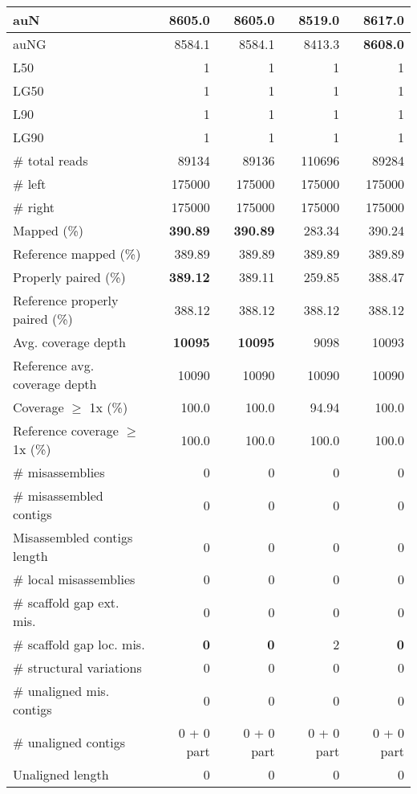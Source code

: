 \documentclass[12pt,a4paper]{article}
\begin{document}
\begin{table}[ht]
\begin{center}
\begin{tabular}{|l*{4}{|r}|}
auN & 8605.0 & 8605.0 & 8519.0 & {\bf 8617.0} \\ \hline
auNG & 8584.1 & 8584.1 & 8413.3 & {\bf 8608.0} \\ \hline
L50 & 1 & 1 & 1 & 1 \\ \hline
LG50 & 1 & 1 & 1 & 1 \\ \hline
L90 & 1 & 1 & 1 & 1 \\ \hline
LG90 & 1 & 1 & 1 & 1 \\ \hline
\# total reads & 89134 & 89136 & 110696 & 89284 \\ \hline
\# left & 175000 & 175000 & 175000 & 175000 \\ \hline
\# right & 175000 & 175000 & 175000 & 175000 \\ \hline
Mapped (\%) & {\bf 390.89} & {\bf 390.89} & 283.34 & 390.24 \\ \hline
Reference mapped (\%) & 389.89 & 389.89 & 389.89 & 389.89 \\ \hline
Properly paired (\%) & {\bf 389.12} & 389.11 & 259.85 & 388.47 \\ \hline
Reference properly paired (\%) & 388.12 & 388.12 & 388.12 & 388.12 \\ \hline
Avg. coverage depth & {\bf 10095} & {\bf 10095} & 9098 & 10093 \\ \hline
Reference avg. coverage depth & 10090 & 10090 & 10090 & 10090 \\ \hline
Coverage $\geq$ 1x (\%) & 100.0 & 100.0 & 94.94 & 100.0 \\ \hline
Reference coverage $\geq$ 1x (\%) & 100.0 & 100.0 & 100.0 & 100.0 \\ \hline
\# misassemblies & 0 & 0 & 0 & 0 \\ \hline
\# misassembled contigs & 0 & 0 & 0 & 0 \\ \hline
Misassembled contigs length & 0 & 0 & 0 & 0 \\ \hline
\# local misassemblies & 0 & 0 & 0 & 0 \\ \hline
\# scaffold gap ext. mis. & 0 & 0 & 0 & 0 \\ \hline
\# scaffold gap loc. mis. & {\bf 0} & {\bf 0} & 2 & {\bf 0} \\ \hline
\# structural variations & 0 & 0 & 0 & 0 \\ \hline
\# unaligned mis. contigs & 0 & 0 & 0 & 0 \\ \hline
\# unaligned contigs & 0 + 0 part & 0 + 0 part & 0 + 0 part & 0 + 0 part \\ \hline
Unaligned length & 0 & 0 & 0 & 0 \\ \hline

\end{tabular}
\end{center}
\end{table}
\end{document}
